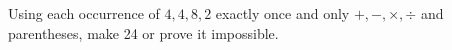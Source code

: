 Using each occurrence of $4,4,8,2$ exactly once and only $+,-,\times,\div$ and parentheses, make 24 or prove it impossible.
